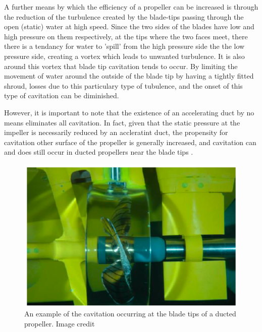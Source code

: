 \documentclass{article}\usepackage[]{graphicx}\usepackage[]{color}
\begin{document}
A further means by which the efficiency of a propeller can be increased is through the reduction of the turbulence created by the blade-tips passing through the open (static) water at high speed.  Since the two sides of the blades have low and high pressure on them respectively, at the tips where the two faces meet, there there is a tendancy for water to 'spill' from the high pressure side the the low pressure side, creating a vortex which leads to unwanted turbulence.  It is also around this vortex that blade tip cavitation tends to occur. By limiting the movement of water around the outside of the blade tip by having a tightly fitted shroud, losses due to this particulary type of tubulence, and the onset of this type of cavitation can be diminished.

However, it is important to note that the existence of an accelerating duct by no means eliminates all cavitation.  In fact, given that the static pressure at the impeller is necessarily reduced by an accleratint duct, the propensity for cavitation other surface of the propeller is generally increased, and cavitation can and does still occur in ducted propellers near the blade tips \parencite{moulijn2015}.

\begin{figure}
\includegraphics[width=\textwidth]{CavitatingDuct.png}
\caption{An example of the cavitation occurring at the blade tips of a ducted propeller. Image credit \cite{moulijn2015}}
\label{fig:CavitatingDuct.png}
\end{figure}
\end{document}
